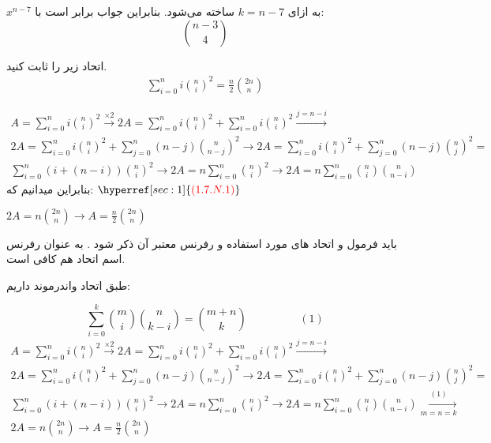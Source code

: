 \documentclass[11pt,largemargins]{h2wp}
\begin{document}
                $x^{n - 7}$ به ازای $k = n -7$ ساخته می‌شود. بنابراین جواب برابر است با:\\
               
                    $$\binom{n - 3}{4}$$
        

\question
 اتحاد زیر را ثابت کنید.
     \begin{align*}
     \sum_{i=0}^{n} i{\binom{n}{i}}^2 = \frac{n}{2} \binom{2n}{n}
     \end{align*}
     
\solution
\begin{align*}
A=\sum_{i=0}^{n} i{\binom{n}{i}}^2 \xrightarrow{\times 2} 2A = \sum_{i=0}^{n} i{\binom{n}{i}}^2 + \sum_{i=0}^{n} i{\binom{n}{i}}^2 \xrightarrow{ j=n-i } \\ 
2A = \sum_{i=0}^{n} i{\binom{n}{i}}^2 + \sum_{j=0}^{n} (n-j){\binom{n}{n-j}}^2 \rightarrow 2A = \sum_{i=0}^{n} i{\binom{n}{i}}^2 + \sum_{j=0}^{n} (n-j){\binom{n}{j}}^2 = \\
 \sum_{i=0}^{n} (i + (n-i)) {\binom{n}{i}}^2 \rightarrow 2A = n \sum_{i=0}^{n} {\binom{n}{i}}^2 \rightarrow 2A = n \sum_{i=0}^{n} \binom{n}{i} \binom{n}{n-i}
\end{align*}
بنابراین میدانیم که:
  $ \hyperref[sec:1]{\textcolor{red}{(1.7.N.1)}}  $
  \begin{center}
  $  2A = n\binom{2n}{n} \rightarrow A= \frac{n}{2} \binom{2n}{n} $
  \end{center}


\notes

\Nnote  باید فرمول و اتحاد های مورد استفاده و رفرنس معتبر آن ‌ذکر شود . به عنوان رفرنس اسم اتحاد هم کافی است. 
 \label{sec:1}         	 
 
 
 طبق اتحاد واندرموند داریم:

$$ \sum_{i=0}^{k} \binom{m}{i} \binom{n}{k-i} = \binom {m+n}{k} \hspace{2cm} (1) $$
\begin{align*}
A=\sum_{i=0}^{n} i{\binom{n}{i}}^2 \xrightarrow{\times 2} 2A = \sum_{i=0}^{n} i{\binom{n}{i}}^2 + \sum_{i=0}^{n} i{\binom{n}{i}}^2 \xrightarrow{ j=n-i } \\ 
2A = \sum_{i=0}^{n} i{\binom{n}{i}}^2 + \sum_{j=0}^{n} (n-j){\binom{n}{n-j}}^2 \rightarrow 2A = \sum_{i=0}^{n} i{\binom{n}{i}}^2 + \sum_{j=0}^{n} (n-j){\binom{n}{j}}^2 = \\
 \sum_{i=0}^{n} (i + (n-i)) {\binom{n}{i}}^2 \rightarrow 2A = n \sum_{i=0}^{n} {\binom{n}{i}}^2 \rightarrow 2A = n \sum_{i=0}^{n} \binom{n}{i} \binom{n}{n-i} \xrightarrow[m=n=k]{(1)} \\
 2A= n \binom{2n}{n} \rightarrow A= \frac{n}{2} \binom{2n}{n}
\end{align*}
\end{document}

